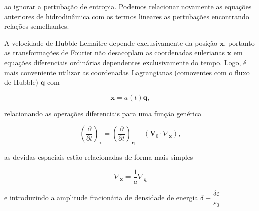 ao ignorar a pertubação de entropia. Podemos relacionar novamente as equações anteriores de hidrodinâmica com os termos lineares as pertubações encontrando relações semelhantes. 

A velocidade de Hubble-Lemaître depende exclusivamente da posição $ \mathbf{x} $, portanto as transformações de Fourier não desacoplam as coordenadas eulerianas $ \mathbf{x} $ em equações diferenciais ordinárias dependentes exclusivamente do tempo. Logo, é mais conveniente utilizar as coordenadas Lagrangianas (comoventes com o fluxo de Hubble) $ \mathbf{q} $ com  

\begin{equation}\label{eq24}
	\mathbf{x} = a(t)\mathbf{q},
\end{equation}

relacionando as operações diferenciais para uma função genérica 

\begin{equation}\label{eq25}
	\left(\dfrac{\partial}{\partial t}\right)_\mathbf{x} = \left( \dfrac{\partial}{\partial t} \right)_\mathbf{q} - (\mathbf{V}_0 \cdot \nabla_\mathbf{x}),
\end{equation}

as devidas espaciais estão relacionadas de forma mais simples

\begin{equation}\label{eq26}
	\nabla_\mathbf{x} = \dfrac{1}{a}\nabla_\mathbf{q}
\end{equation}

e introduzindo a amplitude fracionária de densidade de energia $ \delta \equiv \dfrac{\delta\varepsilon}{\varepsilon_0} $







